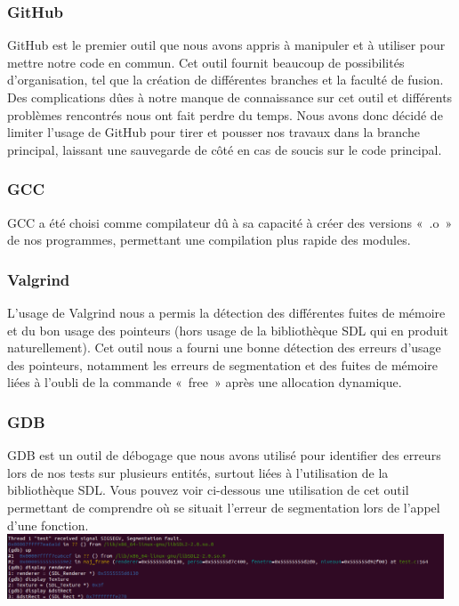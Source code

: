 \documentclass[12pt,a4paper]{article}
\begin{document}
            \subsubsection{GitHub}
                \tabto{1cm} GitHub est le premier outil que nous avons appris à manipuler et à utiliser pour mettre notre code en commun. Cet outil fournit beaucoup de possibilités d’organisation, tel que la création de différentes branches et la faculté de fusion. Des complications dûes à notre manque de connaissance sur cet outil et différents problèmes rencontrés nous ont fait perdre du temps. Nous avons donc décidé de limiter l’usage de GitHub pour tirer et pousser nos travaux dans la branche principal, laissant une sauvegarde de côté en cas de soucis sur le code principal.

            \subsubsection{GCC}
                    \tabto{1cm} GCC a été choisi comme compilateur dû à sa capacité à créer des versions «~.o~» de nos programmes, permettant une compilation plus rapide des modules.
            
            \subsubsection{Valgrind}
                \tabto{1cm} L’usage de Valgrind nous a permis la détection des différentes fuites de mémoire et du bon usage des pointeurs (hors usage de la bibliothèque SDL qui en produit naturellement). Cet outil nous a fourni une bonne détection des erreurs d’usage des pointeurs, notamment les erreurs de segmentation et des fuites de mémoire liées à l’oubli de la commande «~free~» après une allocation dynamique.
                
            \subsubsection{GDB}
                \tabto{1cm} GDB est un outil de débogage que nous avons utilisé pour identifier des erreurs lors de nos tests sur plusieurs entités, surtout liées à l’utilisation de la bibliothèque SDL. Vous pouvez voir ci-dessous une utilisation de cet outil permettant de comprendre où se situait l’erreur de segmentation lors de l’appel d’une fonction.\\

                \includegraphics[width=13cm]{images/debogage.png}\\
                
\end{document}

